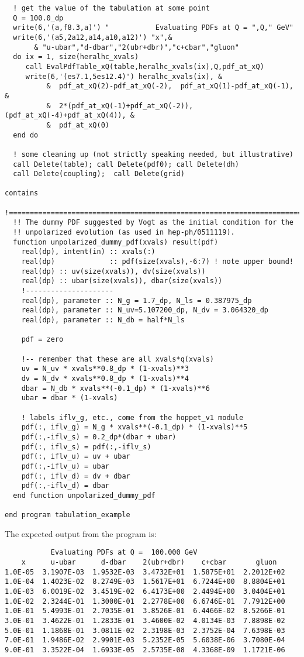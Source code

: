 \documentclass[12pt]{article}
\begin{document}
\begin{lstlisting}
  ! get the value of the tabulation at some point
  Q = 100.0_dp
  write(6,'(a,f8.3,a)') "           Evaluating PDFs at Q = ",Q," GeV"
  write(6,'(a5,2a12,a14,a10,a12)') "x",&
       & "u-ubar","d-dbar","2(ubr+dbr)","c+cbar","gluon"
  do ix = 1, size(heralhc_xvals)
     call EvalPdfTable_xQ(table,heralhc_xvals(ix),Q,pdf_at_xQ)
     write(6,'(es7.1,5es12.4)') heralhc_xvals(ix), &
          &  pdf_at_xQ(2)-pdf_at_xQ(-2),  pdf_at_xQ(1)-pdf_at_xQ(-1), &
          &  2*(pdf_at_xQ(-1)+pdf_at_xQ(-2)), (pdf_at_xQ(-4)+pdf_at_xQ(4)), &
          &  pdf_at_xQ(0)
  end do
  
  ! some cleaning up (not strictly speaking needed, but illustrative)
  call Delete(table); call Delete(pdf0); call Delete(dh)
  call Delete(coupling);  call Delete(grid)

contains 
  !======================================================================
  !! The dummy PDF suggested by Vogt as the initial condition for the 
  !! unpolarized evolution (as used in hep-ph/0511119).
  function unpolarized_dummy_pdf(xvals) result(pdf)
    real(dp), intent(in) :: xvals(:)
    real(dp)             :: pdf(size(xvals),-6:7) ! note upper bound!
    real(dp) :: uv(size(xvals)), dv(size(xvals))
    real(dp) :: ubar(size(xvals)), dbar(size(xvals))
    !---------------------
    real(dp), parameter :: N_g = 1.7_dp, N_ls = 0.387975_dp
    real(dp), parameter :: N_uv=5.107200_dp, N_dv = 3.064320_dp
    real(dp), parameter :: N_db = half*N_ls
  
    pdf = zero

    !-- remember that these are all xvals*q(xvals)
    uv = N_uv * xvals**0.8_dp * (1-xvals)**3
    dv = N_dv * xvals**0.8_dp * (1-xvals)**4
    dbar = N_db * xvals**(-0.1_dp) * (1-xvals)**6
    ubar = dbar * (1-xvals)

    ! labels iflv_g, etc., come from the hoppet_v1 module
    pdf(:, iflv_g) = N_g * xvals**(-0.1_dp) * (1-xvals)**5
    pdf(:,-iflv_s) = 0.2_dp*(dbar + ubar)
    pdf(:, iflv_s) = pdf(:,-iflv_s)
    pdf(:, iflv_u) = uv + ubar
    pdf(:,-iflv_u) = ubar
    pdf(:, iflv_d) = dv + dbar
    pdf(:,-iflv_d) = dbar
  end function unpolarized_dummy_pdf

end program tabulation_example
\end{lstlisting}

\noindent The expected output from the program is:
{\small
\begin{lstlisting}
           Evaluating PDFs at Q =  100.000 GeV
    x      u-ubar      d-dbar    2(ubr+dbr)    c+cbar       gluon
1.0E-05  3.1907E-03  1.9532E-03  3.4732E+01  1.5875E+01  2.2012E+02
1.0E-04  1.4023E-02  8.2749E-03  1.5617E+01  6.7244E+00  8.8804E+01
1.0E-03  6.0019E-02  3.4519E-02  6.4173E+00  2.4494E+00  3.0404E+01
1.0E-02  2.3244E-01  1.3000E-01  2.2778E+00  6.6746E-01  7.7912E+00
1.0E-01  5.4993E-01  2.7035E-01  3.8526E-01  6.4466E-02  8.5266E-01
3.0E-01  3.4622E-01  1.2833E-01  3.4600E-02  4.0134E-03  7.8898E-02
5.0E-01  1.1868E-01  3.0811E-02  2.3198E-03  2.3752E-04  7.6398E-03
7.0E-01  1.9486E-02  2.9901E-03  5.2352E-05  5.6038E-06  3.7080E-04
9.0E-01  3.3522E-04  1.6933E-05  2.5735E-08  4.3368E-09  1.1721E-06
\end{lstlisting}
}
\end{document}
